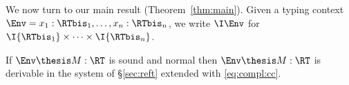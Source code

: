 
We now turn to our main result (Theorem~\ref{thm:main}).
Given a typing context $\Env = x_1:\RTbis_1,\dots,x_n:\RTbis_n$,
we write $\I\Env$ for $\I{\RTbis_1} \times \dots \times \I{\RTbis_n}$.

\begin{theorem}
\label{thm:app:main}
If $\Env \thesis M : \RT$ is sound and normal
then $\Env \thesis M : \RT$ is derivable in the system of \S\ref{sec:reft}
extended with \eqref{eq:compl:cc}.
\end{theorem}

